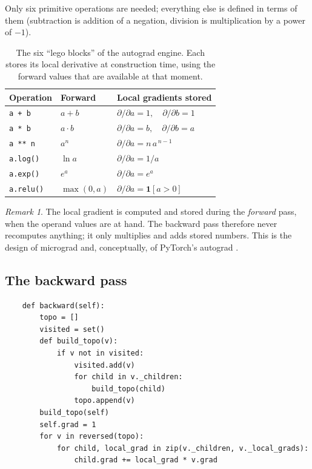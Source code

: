 \documentclass[11pt,letterpaper]{article}
\theoremstyle{remark}
\newtheorem{remark}{Remark}[section]
\newcommand{\code}[1]{\lstinline[basicstyle=\ttfamily\small]|#1|}
\begin{document}
Only six primitive operations are needed; everything else is defined in terms of them (subtraction is addition of a negation, division is multiplication by a power of $-1$).

\begin{table}[h]
\centering\small
\begin{tabular}{@{}lll@{}}
\toprule
Operation & Forward & Local gradients stored \\
\midrule
\code{a + b} & $a+b$ & $\partial/\partial a = 1,\quad \partial/\partial b = 1$ \\
\code{a * b} & $a\cdot b$ & $\partial/\partial a = b,\quad \partial/\partial b = a$ \\
\code{a ** n} & $a^n$ & $\partial/\partial a = n\,a^{\,n-1}$ \\
\code{a.log()} & $\ln a$ & $\partial/\partial a = 1/a$ \\
\code{a.exp()} & $e^a$ & $\partial/\partial a = e^a$ \\
\code{a.relu()} & $\max(0,a)$ & $\partial/\partial a = \mathbf 1[a>0]$ \\
\bottomrule
\end{tabular}
\caption{The six ``lego blocks'' of the autograd engine. Each stores its local derivative at construction time, using the forward values that are available at that moment.}
\label{tab:lego}
\end{table}

\begin{remark}
The local gradient is computed and stored during the \emph{forward} pass, when the operand values are at hand. The backward pass therefore never recomputes anything; it only multiplies and adds stored numbers. This is the design of micrograd \parencite{karpathy2020micrograd} and, conceptually, of PyTorch's autograd \parencite{paszke2017autodiff}.
\end{remark}

\subsection{The backward pass}

\begin{lstlisting}
    def backward(self):
        topo = []
        visited = set()
        def build_topo(v):
            if v not in visited:
                visited.add(v)
                for child in v._children:
                    build_topo(child)
                topo.append(v)
        build_topo(self)
        self.grad = 1
        for v in reversed(topo):
            for child, local_grad in zip(v._children, v._local_grads):
                child.grad += local_grad * v.grad
\end{lstlisting}
\end{document}
